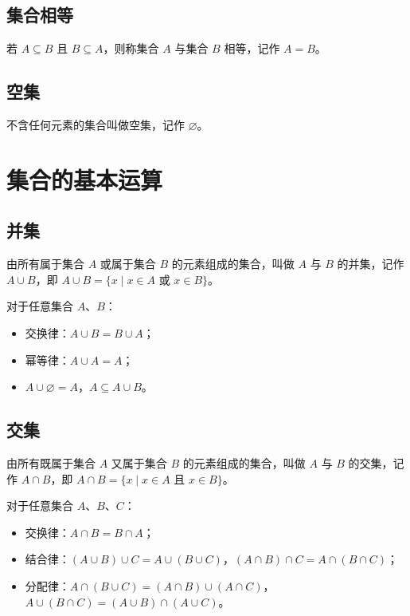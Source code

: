 \subsection{集合相等}
\begin{definition}[集合相等]
若 $A \subseteq B$ 且 $B \subseteq A$，则称集合 $A$ 与集合 $B$ 相等，记作 $A = B$。
\end{definition}
\subsection{空集}
\begin{definition}[空集]
不含任何元素的集合叫做空集，记作 $\varnothing$。
\end{definition}

\section{集合的基本运算}
\subsection{并集}
\begin{definition}[并集]
由所有属于集合 $A$ 或属于集合 $B$ 的元素组成的集合，叫做 $A$ 与 $B$ 的并集，记作 $A \cup B$，即 $A \cup B = \{x \mid x \in A \text{ 或 } x \in B\}$。
\end{definition}
\begin{lemma}[并集的性质]
对于任意集合 $A$、$B$：
\begin{itemize}
    \item 交换律：$A \cup B=B \cup A$；
    \item 幂等律：$A \cup A=A$；
    \item $A \cup \varnothing=A$，$A \subseteq A \cup B$。
\end{itemize}
\end{lemma}
\subsection{交集}
\begin{definition}[交集]
由所有既属于集合 $A$ 又属于集合 $B$ 的元素组成的集合，叫做 $A$ 与 $B$ 的交集，记作 $A \cap B$，即 $A \cap B = \{x \mid x \in A \text{ 且 } x \in B\}$。
\end{definition}
\begin{theorem}[并集与交集的运算律]
对于任意集合 $A$、$B$、$C$：
\begin{itemize}
    \item 交换律：$A \cap B=B \cap A$；
    \item 结合律：$(A \cup B) \cup C=A \cup (B \cup C)$，$(A \cap B) \cap C=A \cap (B \cap C)$；
    \item 分配律：$A \cap (B \cup C)=(A \cap B) \cup (A \cap C)$，$A \cup (B \cap C)=(A \cup B) \cap (A \cup C)$。
\end{itemize}
\end{theorem}
